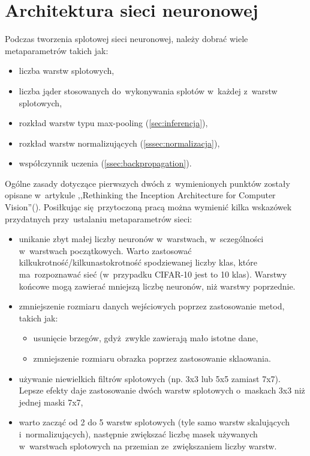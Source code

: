 \chapter{Architektura sieci neuronowej}
Podczas tworzenia splotowej sieci neuronowej, należy dobrać wiele metaparametrów takich jak:
\begin{itemize}
    \item liczba warstw splotowych,
    \item liczba jąder stosowanych do~wykonywania splotów w~każdej z~warstw splotowych,
    \item rozkład warstw typu max-pooling (\ref{sec:inferencja}),
    \item rozkład warstw normalizujących (\ref{sssec:normalizacja}),
    \item współczynnik uczenia (\ref{ssec:backpropagation}).
\end{itemize}

Ogólne zasady dotyczące pierwszych dwóch z~wymienionych punktów zostały opisane w~artykule
,,Rethinking the Inception Architecture for Computer Vision''(\cite{RIACV}). Posiłkując się~przytoczoną pracą można
wymienić kilka wskazówek przydatnych przy~ustalaniu metaparametrów sieci:
\begin{itemize}
    \item unikanie zbyt małej liczby neuronów w~warstwach, w~sczególności w~warstwach początkowych. Warto zastosować
          kilkukrotność/kilkunastokrotność spodziewanej liczby klas, które ma~rozpoznawać sieć
          (w~przypadku CIFAR-10 jest to 10 klas). Warstwy końcowe mogą zawierać mniejszą liczbę neuronów, niż warstwy
          poprzednie.
    \item zmniejszenie rozmiaru danych wejściowych poprzez zastosowanie metod, takich jak:
          \begin{itemize}
              \item usunięcie brzegów, gdyż~zwykle zawierają mało istotne dane,
              \item zmniejszenie rozmiaru obrazka poprzez zastosowanie sklaowania.
          \end{itemize}
    \item używanie niewielkich filtrów splotowych (np. 3x3 lub 5x5 zamiast 7x7). Lepsze efekty daje zastosowanie dwóch
          warstw splotowych o~maskach 3x3 niż jednej maski 7x7,
    \item warto zacząć od 2 do 5 warstw splotowych (tyle samo warstw skalujących i~normalizujących), następnie zwiększać
          liczbę masek używanych w~warstwach splotowych na przemian ze~zwiększaniem liczby warstw.
\end{itemize}

